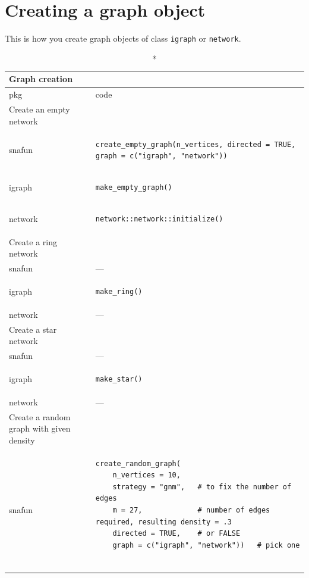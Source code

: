 \documentclass[
]{article}
\begin{document}
\hypertarget{generate}{%
\section{Creating a graph object}\label{generate}}

This is how you create graph objects of class \texttt{igraph} or
\texttt{network}.

\captionsetup[table]{labelformat=empty,skip=1pt}
\setlength{\LTpost}{0mm}
\begin{longtable}{ll}
\caption*{
{\large Graph creation}
} \\ 
\toprule
pkg & code \\ 
\midrule
\multicolumn{1}{l}{Create an empty network} \\ 
\midrule
snafun & \begin{verbatim}
create_empty_graph(n_vertices, directed = TRUE, graph = c("igraph", "network"))
\end{verbatim} \\ 
igraph & \begin{verbatim}
make_empty_graph()
\end{verbatim} \\ 
network & \begin{verbatim}
network::network::initialize()
\end{verbatim} \\ 
\midrule
\multicolumn{1}{l}{Create a ring network} \\ 
\midrule
snafun & — \\ 
igraph & \begin{verbatim}
make_ring()
\end{verbatim} \\ 
network & — \\ 
\midrule
\multicolumn{1}{l}{Create a star network} \\ 
\midrule
snafun & — \\ 
igraph & \begin{verbatim}
make_star()
\end{verbatim} \\ 
network & — \\ 
\midrule
\multicolumn{1}{l}{Create a random graph with given density} \\ 
\midrule
snafun & \begin{verbatim}
create_random_graph(
    n_vertices = 10,
    strategy = "gnm",   # to fix the number of edges
    m = 27,             # number of edges required, resulting density = .3
    directed = TRUE,    # or FALSE
    graph = c("igraph", "network"))   # pick one


\end{verbatim}
\end{longtable}
\end{document}
